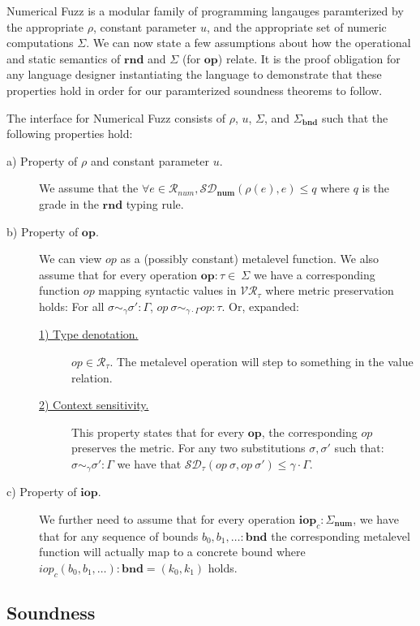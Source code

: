Numerical Fuzz is a modular family of programming langauges paramterized by the
appropriate $\rho$, constant parameter $u$, and the appropriate set of numeric
computations $\Sigma$.  
We can now state a few assumptions about how the operational and static
semantics of $\mathbf{rnd}$ and $\Sigma$ (for $\mathbf{op}$) relate.
It is the proof obligation for any language designer instantiating the language
to demonstrate that these properties hold in order for our paramterized
soundness theorems to follow.
\begin{definition}
  \label{def:numfuzz-interface}
  The interface for Numerical Fuzz consists of $\rho$, $u$, $\Sigma$, and
  $\Sigma_{\mathbf{bnd}}$ such that the following properties hold: 
\begin{description}
  \item[a) Property of $\rho$ and constant parameter $u$.] We assume that the
    $\forall e \in \mathcal{R}_{num}, \mathcal{SD}_{\mathbf{num}}(\rho(e), e)
    \leq q$ where $q$ is the grade in the $\mathbf{rnd}$ typing rule.
  \item[b) Property of $\mathbf{op}$.] 
    We can view $\textit{op}$ as a (possibly constant) metalevel function.
    We also assume that for every operation
    $\mathbf{op} : \tau \in \ \Sigma$ we have a
    corresponding function $op$ mapping syntactic values in
    $\mathcal{VR}_{\tau}$ where metric preservation holds: For all $\sigma
    \sim_{\gamma} \sigma' : \Gamma$, $\textit{op}~\sigma \sim_{\gamma \cdot
    \Gamma} \textit{op} : \tau$.
    Or, expanded:
    \begin{description}
      \item[\underline{1) Type denotation.}] $\mathit{op} \in
        \mathcal{R}_{\tau}$. The metalevel operation will step to something in the
        value relation.
      \item[\underline{2) Context sensitivity.}]
        This property states that for every $\textbf{op}$, the
        corresponding $\textit{op}$ preserves the metric. For any two
        substitutions $\sigma, \sigma'$ such that:
        $\sigma \sim_{\gamma} \sigma' : \Gamma$
        we have that
        $\mathcal{SD}_{\tau}(\textit{op}~\sigma, \textit{op}~\sigma') \leq \gamma \cdot \Gamma$.
    \end{description} \item[c) Property of $\mathbf{iop}$.] We further need to
      assume that for every operation $\mathbf{iop}_c : \Sigma_\textbf{num}$, we
      have that for any sequence of bounds $b_0, b_1, \ldots : \textbf{bnd}$ the
      corresponding metalevel function will actually map to a concrete bound
      where $\textit{iop}_c(b_0, b_1, \ldots) : \textbf{bnd} = (k_0, k_1)$
      holds.
\end{description}
\end{definition}

\subsection{Soundness}


